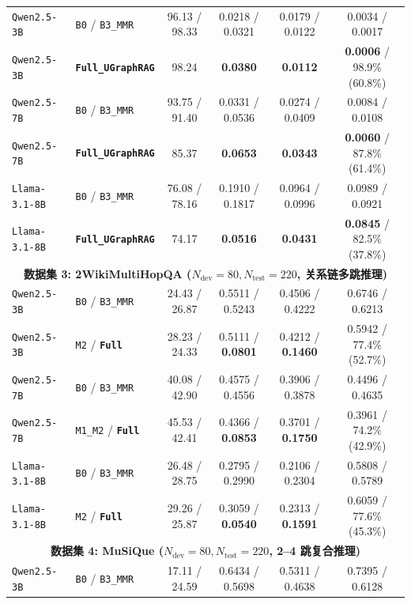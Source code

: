 \documentclass[11pt]{article}
\begin{document}
\begin{table}[t]
{{\begin{tabular}{llcccc}
\midrule
\texttt{Qwen2.5-3B} & \texttt{B0} / \texttt{B3\_MMR} & 96.13 / 98.33 & 0.0218 / 0.0321 & 0.0179 / 0.0122 & 0.0034 / 0.0017 \\
\texttt{Qwen2.5-3B} & \textbf{\texttt{Full\_UGraphRAG}} & 98.24 & \textbf{0.0380} & \textbf{0.0112} & \textbf{0.0006} / 98.9\% (60.8\%) \\
\texttt{Qwen2.5-7B} & \texttt{B0} / \texttt{B3\_MMR} & 93.75 / 91.40 & 0.0331 / 0.0536 & 0.0274 / 0.0409 & 0.0084 / 0.0108 \\
\texttt{Qwen2.5-7B} & \textbf{\texttt{Full\_UGraphRAG}} & 85.37 & \textbf{0.0653} & \textbf{0.0343} & \textbf{0.0060} / 87.8\% (61.4\%) \\
\texttt{Llama-3.1-8B} & \texttt{B0} / \texttt{B3\_MMR} & 76.08 / 78.16 & 0.1910 / 0.1817 & 0.0964 / 0.0996 & 0.0989 / 0.0921 \\
\texttt{Llama-3.1-8B} & \textbf{\texttt{Full\_UGraphRAG}} & 74.17 & \textbf{0.0516} & \textbf{0.0431} & \textbf{0.0845} / 82.5\% (37.8\%) \\
\midrule
\multicolumn{6}{c}{\textbf{数据集 3: 2WikiMultiHopQA ($N_{\text{dev}}=80, N_{\text{test}}=220$, 关系链多跳推理)}} \\
\midrule
\texttt{Qwen2.5-3B} & \texttt{B0} / \texttt{B3\_MMR} & 24.43 / 26.87 & 0.5511 / 0.5243 & 0.4506 / 0.4222 & 0.6746 / 0.6213 \\
\texttt{Qwen2.5-3B} & \texttt{M2} / \textbf{\texttt{Full}} & 28.23 / 24.33 & 0.5111 / \textbf{0.0801} & 0.4212 / \textbf{0.1460} & 0.5942 / 77.4\% (52.7\%) \\
\texttt{Qwen2.5-7B} & \texttt{B0} / \texttt{B3\_MMR} & 40.08 / 42.90 & 0.4575 / 0.4556 & 0.3906 / 0.3878 & 0.4496 / 0.4635 \\
\texttt{Qwen2.5-7B} & \texttt{M1\_M2} / \textbf{\texttt{Full}} & 45.53 / 42.41 & 0.4366 / \textbf{0.0853} & 0.3701 / \textbf{0.1750} & 0.3961 / 74.2\% (42.9\%) \\
\texttt{Llama-3.1-8B} & \texttt{B0} / \texttt{B3\_MMR} & 26.48 / 28.75 & 0.2795 / 0.2990 & 0.2106 / 0.2304 & 0.5808 / 0.5789 \\
\texttt{Llama-3.1-8B} & \texttt{M2} / \textbf{\texttt{Full}} & 29.26 / 25.87 & 0.3059 / \textbf{0.0540} & 0.2313 / \textbf{0.1591} & 0.6059 / 77.6\% (45.3\%) \\
\midrule
\multicolumn{6}{c}{\textbf{数据集 4: MuSiQue ($N_{\text{dev}}=80, N_{\text{test}}=220$, 2--4 跳复合推理)}} \\
\midrule
\texttt{Qwen2.5-3B} & \texttt{B0} / \texttt{B3\_MMR} & 17.11 / 24.59 & 0.6434 / 0.5698 & 0.5311 / 0.4638 & 0.7395 / 0.6128 \\

\end{tabular}}}
\end{table}
\end{document}
